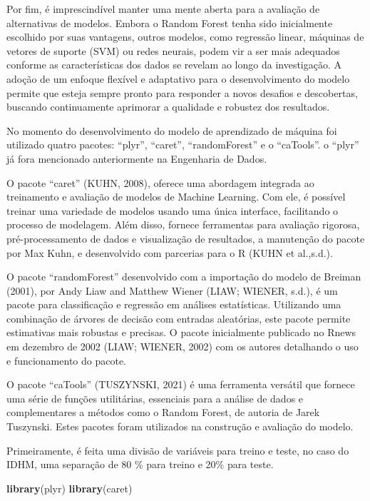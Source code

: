 \documentclass[
]{article}
\newenvironment{Shaded}{\begin{snugshade}}{\end{snugshade}}
\newcommand{\FunctionTok}[1]{\textcolor[rgb]{0.13,0.29,0.53}{\textbf{#1}}}
\newcommand{\NormalTok}[1]{#1}
\begin{document}
Por fim, é imprescindível manter uma mente aberta para a avaliação de
alternativas de modelos. Embora o Random Forest tenha sido inicialmente
escolhido por suas vantagens, outros modelos, como regressão linear,
máquinas de vetores de suporte (SVM) ou redes neurais, podem vir a ser
mais adequados conforme as características dos dados se revelam ao longo
da investigação. A adoção de um enfoque flexível e adaptativo para o
desenvolvimento do modelo permite que esteja sempre pronto para
responder a novos desafios e descobertas, buscando continuamente
aprimorar a qualidade e robustez dos resultados.

No momento do desenvolvimento do modelo de aprendizado de máquina foi
utilizado quatro pacotes: ``plyr'', ``caret'', ``randomForest'' e o
``caTools''. o ``plyr'' já fora mencionado anteriormente na Engenharia
de Dados.

O pacote ``caret'' (KUHN, 2008), oferece uma abordagem integrada ao
treinamento e avaliação de modelos de Machine Learning. Com ele, é
possível treinar uma variedade de modelos usando uma única interface,
facilitando o processo de modelagem. Além disso, fornece ferramentas
para avaliação rigorosa, pré-processamento de dados e visualização de
resultados, a manutenção do pacote por Max Kuhn, e desenvolvido com
parcerias para o R (KUHN et al.,s.d.).

O pacote ``randomForest'' desenvolvido com a importação do modelo de
Breiman (2001), por Andy Liaw and Matthew Wiener (LIAW; WIENER, s.d.), é
um pacote para classificação e regressão em análises estatísticas.
Utilizando uma combinação de árvores de decisão com entradas aleatórias,
este pacote permite estimativas mais robustas e precisas. O pacote
inicialmente publicado no Rnews em dezembro de 2002 (LIAW; WIENER, 2002)
com os autores detalhando o uso e funcionamento do pacote.

O pacote ``caTools'' (TUSZYNSKI, 2021) é uma ferramenta versátil que
fornece uma série de funções utilitárias, essenciais para a análise de
dados e complementares a métodos como o Random Forest, de autoria de
Jarek Tuszynski. Estes pacotes foram utilizados na construção e
avaliação do modelo.

Primeiramente, é feita uma divisão de variáveis para treino e teste, no
caso do IDHM, uma separação de 80 \% para treino e 20\% para teste.

\begin{Shaded}
\begin{Highlighting}[]
\FunctionTok{library}\NormalTok{(plyr)}
\FunctionTok{library}\NormalTok{(caret)}
\end{Highlighting}
\end{Shaded}
\end{document}
